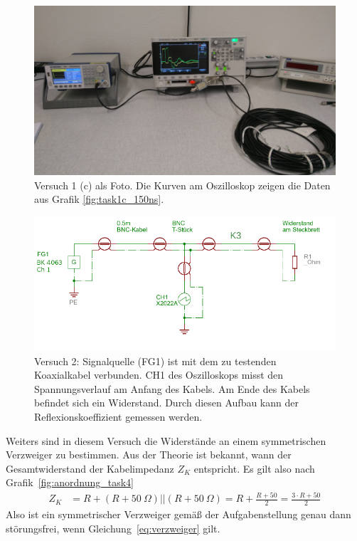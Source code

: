 \documentclass{article}
\begin{document}
\begin{figure}[H]
\centering
\caption{Versuch 1 (c) als Foto. Die Kurven am Oszilloskop zeigen die Daten aus Grafik \ref{fig:task1c_150ns}.}
\label{fig:foto_task1c}
\includegraphics[scale=0.6]{foto_task1c.jpg}
\end{figure}


\begin{figure}[H]
\centering
\caption{Versuch 2: Signalquelle (FG1) ist mit dem zu testenden Koaxialkabel verbunden. CH1 des Oszilloskops misst den Spannungsverlauf am Anfang des Kabels. Am Ende des Kabels befindet sich ein Widerstand. Durch diesen Aufbau kann der Reflexionskoeffizient gemessen werden.}
\label{fig:anordnung_task2}
\includegraphics[scale=2]{task2.png}
\end{figure}


Weiters sind in diesem Versuch die Widerstände an einem symmetrischen Verzweiger zu bestimmen. Aus der Theorie ist bekannt, wann der Gesamtwiderstand der Kabelimpedanz $Z_K$ entspricht. Es gilt also nach Grafik~\ref{fig:anordnung_task4}
\begin{align}
\label{eq:verzweiger}
Z_K &= R + (R+50~\Omega)||(R+50~\Omega) = R + \frac{R+50}{2} = \frac{3\cdot R + 50}{2}
\end{align}
Also ist ein symmetrischer Verzweiger gemäß der Aufgabenstellung genau dann störungsfrei, wenn Gleichung~\eqref{eq:verzweiger} gilt.
\end{document}
